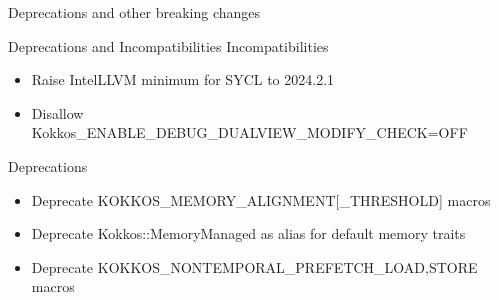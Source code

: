 
\begin{frame}[fragile]

  {\Huge Deprecations and other breaking changes}

  \vspace{10pt}

\end{frame}


\begin{frame}[fragile]{Deprecations and Incompatibilities}
  Incompatibilities
  \begin{itemize}
    \item Raise IntelLLVM minimum for SYCL to 2024.2.1
    \item Disallow Kokkos\_ENABLE\_DEBUG\_DUALVIEW\_MODIFY\_CHECK=OFF
  \end{itemize}
  \vfill
  Deprecations
  \begin{itemize}
    \item Deprecate KOKKOS\_MEMORY\_ALIGNMENT[\_THRESHOLD] macros
    \item Deprecate Kokkos::MemoryManaged as alias for default memory traits
    \item Deprecate KOKKOS\_NONTEMPORAL\_PREFETCH\_{LOAD,STORE} macros
  \end{itemize}
\end{frame}

